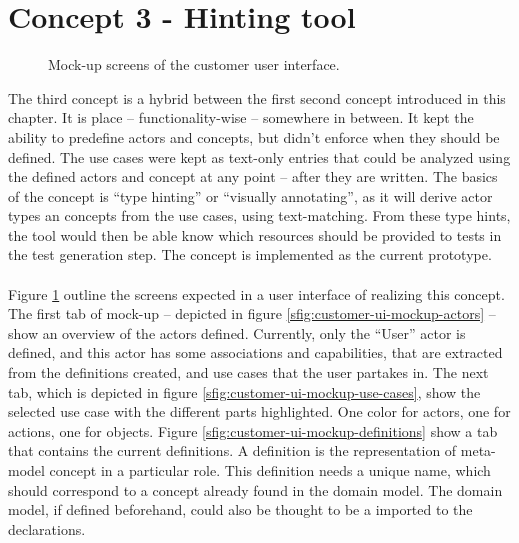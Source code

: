 \section{Concept 3 - Hinting tool}
\begin{figure}[!htbp]
  \centering
    
  \caption{Mock-up screens of the customer user interface.}
  \label{fig:concept3-mockup-screens}
\end{figure}
\noindent The third concept is a hybrid between the first second concept introduced in this chapter. It is place -- functionality-wise -- somewhere in between. It kept the ability to predefine actors and concepts, but didn't enforce when they should be defined. The use cases were kept as text-only entries that could be analyzed using the defined actors and concept at any point -- after they are written. The basics of the concept is ``type hinting'' or ``visually annotating'', as it will derive actor types an concepts from the use cases, using text-matching. From these type hints, the tool would then be able know which resources should be provided to tests in the test generation step. The concept is implemented as the current prototype.\\\\
Figure \ref{fig:concept3-mockup-screens} outline the screens expected in a user interface of realizing this concept. The first tab of mock-up -- depicted in figure \ref{sfig:customer-ui-mockup-actors} -- show an overview of the actors defined. Currently, only the ``User'' actor is defined, and this actor has some associations and capabilities, that are extracted from the definitions created, and use cases that the user partakes in. The next tab, which is depicted in figure \ref{sfig:customer-ui-mockup-use-cases}, show the selected use case with the different parts highlighted. One color for actors, one for actions, one for objects. Figure \ref{sfig:customer-ui-mockup-definitions} show a tab that contains the current definitions. A definition is the representation of meta-model concept in a particular role. This definition needs a unique name, which should correspond to a concept already found in the domain model. The domain model, if defined beforehand, could also be thought to be a imported to the declarations.

